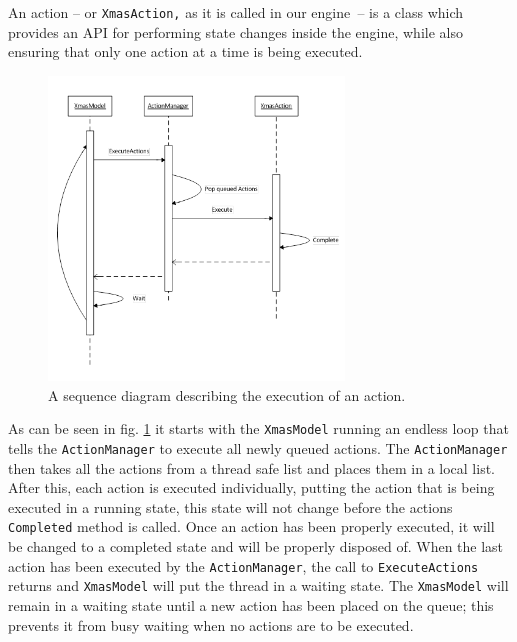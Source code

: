 An action -- or \texttt{XmasAction,} as it is called in our engine\texttt{
}-- is a class which provides an API for performing state changes
inside the engine, while also ensuring that only one action at a time
is being executed. 

\begin{figure}
\begin{centering}
\includegraphics[width=0.7\textwidth]{ImplementationActionQueuingExplanation}
\par\end{centering}

\caption{\label{fig:ImplementationActionQueuingExplanation}A sequence diagram
describing the execution of an action.}
\end{figure}


As can be seen in fig. \ref{fig:ImplementationActionQueuingExplanation}
it starts with the \texttt{XmasModel} running an endless loop that
tells the \texttt{ActionManager} to execute all newly queued actions.
The \texttt{ActionManager} then takes all the actions from a thread
safe list and places them in a local list. After this, each action
is executed individually, putting the action that is being executed
in a running state, this state will not change before the actions
\texttt{Completed} method is called. Once an action has been properly
executed, it will be changed to a completed state and will be properly
disposed of. When the last action has been executed by the \texttt{ActionManager},
the call to \texttt{ExecuteActions} returns and \texttt{XmasModel}
will put the thread in a waiting state. The \texttt{XmasModel} will
remain in a waiting state until a new action has been placed on the
queue; this prevents it from busy waiting when no actions are to be
executed.


